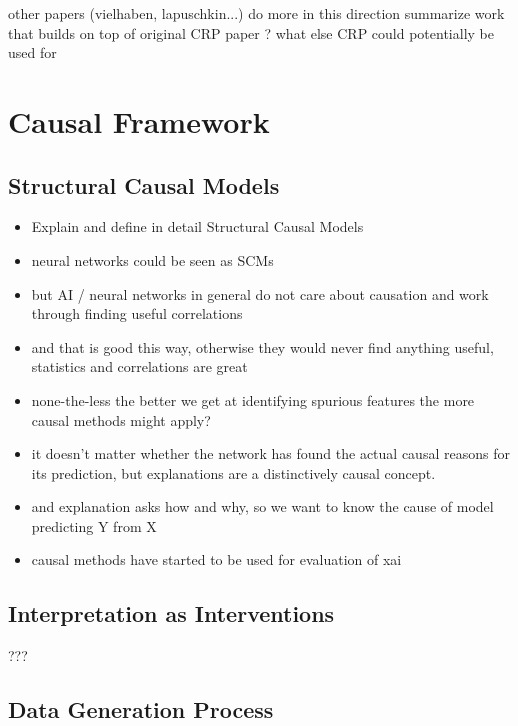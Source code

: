 
other papers (vielhaben, lapuschkin...) do more in this direction
summarize work that builds on top of original CRP paper ?
what else CRP could potentially be used for
\cite{Dreyer2023,Pahde2023,Dreyer2023a,Vielhaben2022,Vielhaben2023,Achtibat2023}

\section{Causal Framework}
\subsection{Structural Causal Models}

\begin{itemize}
    \item Explain and define in detail Structural Causal Models
    \item neural networks could be seen as SCMs \cite{Chattopadhyay2019}
    \item but AI / neural networks in general do not care about causation and work through finding useful correlations
    \item and that is good this way, otherwise they would never find anything useful, statistics and correlations are great
    \item none-the-less the better we get at identifying spurious features the more causal methods might apply?
    \item it doesn't matter whether the network has found the actual causal reasons for its prediction, but explanations are a distinctively causal concept.
    \item and explanation asks how and why, so we want to know the cause of model predicting Y from X
    \item causal methods have started to be used for evaluation of xai
\end{itemize}

\subsection{Interpretation as Interventions}
???

\subsection{Data Generation Process}

